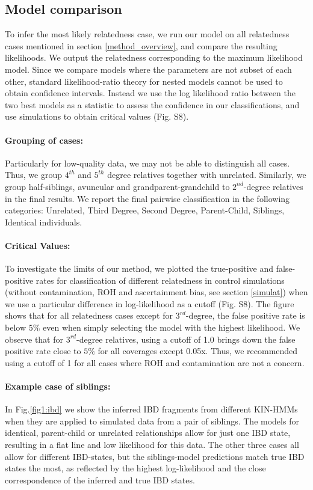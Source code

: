 \documentclass[12pt, letterpaper]{article}
\begin{document}
\subsection{Model comparison}\label{model_comp}
To infer the most likely relatedness case, we run our model on all relatedness cases mentioned in section \ref{method_overview}, and compare the resulting likelihoods. We output the relatedness corresponding to the maximum likelihood model. Since we compare models where the  parameters are not subset of each other, standard likelihood-ratio theory for nested models cannot be used to obtain confidence intervals. Instead we use the log likelihood ratio between the two best models as a statistic to assess the confidence in our classifications, and use simulations to obtain critical values (Fig. S8).

\paragraph{Grouping of cases:}
Particularly for low-quality data, we may not be able to distinguish all cases. Thus, we group $4^{th}$ and $5^{th}$ degree relatives together with unrelated. Similarly, we group  half-siblings, avuncular and grandparent-grandchild to  $2^{nd}$-degree relatives in the final results. We report the final pairwise classification in the following categories: Unrelated, Third Degree, Second Degree, Parent-Child, Siblings, Identical individuals.


\paragraph{Critical Values:}

To investigate the limits of our method, we plotted the true-positive and false-positive rates for classification of different relatedness in control simulations (without contamination, ROH and ascertainment bias, see section \ref{simulat}) when we use a particular difference in log-likelihood as a cutoff (Fig. S8). The figure shows that for all relatedness cases except for $3^{rd}$-degree, the false positive rate is below $5\%$ even when simply selecting the model with the highest likelihood. We observe that for $3^{rd}$-degree relatives, using a cutoff of 1.0 brings down the false positive rate close to $5\%$ for all coverages except 0.05x. Thus, we recommended using a cutoff of 1 for all cases where ROH and contamination are not a concern.


\paragraph{Example case of siblings:}
In Fig.\ref{fig1:ibd} we show the inferred IBD fragments from different KIN-HMMs when they are applied to simulated data from a pair of siblings. The models for identical, parent-child or unrelated relationships allow for just one IBD state, resulting in a flat line and low likelihood for this data. The other three cases all allow for different IBD-states, but the siblings-model predictions match true IBD states the most, as reflected by the highest log-likelihood and the close correspondence of the inferred and true IBD states.
\end{document}
